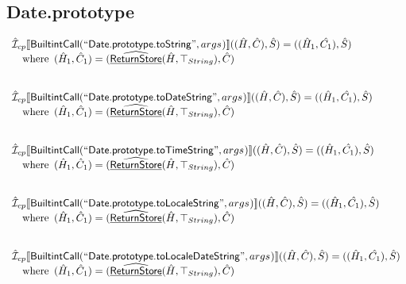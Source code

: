 \subsection{Date.prototype}
\[
\begin{array}{l}
\hat{\mathcal{I}} _{cp}\llbracket \mbox{\textsf{BuiltintCall}}(``\mbox{\textsf{Date.prototype.toString}}",args_{})\rrbracket((\hat{H},\hat{C}), \hat{S})
  = ((\hat{H}_1, \hat{C_1}), \hat{S})\\
\quad{\rm where}\begin{array}[t]{l}
  (\hat{H}_1, \hat{C}_1) = (\widehat{\underline{\sf ReturnStore}}(\hat{H},\top_{String}), \hat{C})\\
  \end{array}\\
\\\\


\hat{\mathcal{I}} _{cp}\llbracket \mbox{\textsf{BuiltintCall}}(``\mbox{\textsf{Date.prototype.toDateString}}",args_{})\rrbracket((\hat{H},\hat{C}), \hat{S})
  = ((\hat{H}_1, \hat{C_1}), \hat{S})\\
\quad{\rm where}\begin{array}[t]{l}
  (\hat{H}_1, \hat{C}_1) = (\widehat{\underline{\sf ReturnStore}}(\hat{H},\top_{String}), \hat{C})\\
  \end{array}\\
\\\\


\hat{\mathcal{I}} _{cp}\llbracket \mbox{\textsf{BuiltintCall}}(``\mbox{\textsf{Date.prototype.toTimeString}}",args_{})\rrbracket((\hat{H},\hat{C}), \hat{S})
  = ((\hat{H}_1, \hat{C_1}), \hat{S})\\
\quad{\rm where}\begin{array}[t]{l}
  (\hat{H}_1, \hat{C}_1) = (\widehat{\underline{\sf ReturnStore}}(\hat{H},\top_{String}), \hat{C})\\
  \end{array}\\
\\\\


\hat{\mathcal{I}} _{cp}\llbracket \mbox{\textsf{BuiltintCall}}(``\mbox{\textsf{Date.prototype.toLocaleString}}",args_{})\rrbracket((\hat{H},\hat{C}), \hat{S})
  = ((\hat{H}_1, \hat{C_1}), \hat{S})\\
\quad{\rm where}\begin{array}[t]{l}
  (\hat{H}_1, \hat{C}_1) = (\widehat{\underline{\sf ReturnStore}}(\hat{H},\top_{String}), \hat{C})\\
  \end{array}\\
\\\\


\hat{\mathcal{I}} _{cp}\llbracket \mbox{\textsf{BuiltintCall}}(``\mbox{\textsf{Date.prototype.toLocaleDateString}}",args_{})\rrbracket((\hat{H},\hat{C}), \hat{S})
  = ((\hat{H}_1, \hat{C_1}), \hat{S})\\
\quad{\rm where}\begin{array}[t]{l}
  (\hat{H}_1, \hat{C}_1) = (\widehat{\underline{\sf ReturnStore}}(\hat{H},\top_{String}), \hat{C})\\
  \end{array}\\
\\\\



\end{array}\]
